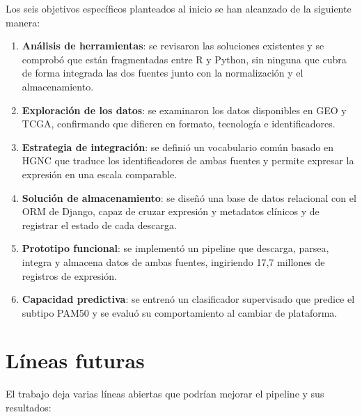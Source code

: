 \documentclass[12pt, a4paper]{report}
\begin{document}
Los seis objetivos específicos planteados al inicio se han alcanzado de la siguiente manera:

\begin{enumerate}
  \item \textbf{Análisis de herramientas}: se revisaron las soluciones existentes y se comprobó que están fragmentadas entre R y Python, sin ninguna que cubra de forma integrada las dos fuentes junto con la normalización y el almacenamiento.
  \item \textbf{Exploración de los datos}: se examinaron los datos disponibles en GEO y TCGA, confirmando que difieren en formato, tecnología e identificadores.
  \item \textbf{Estrategia de integración}: se definió un vocabulario común basado en HGNC que traduce los identificadores de ambas fuentes y permite expresar la expresión en una escala comparable.
  \item \textbf{Solución de almacenamiento}: se diseñó una base de datos relacional con el ORM de Django, capaz de cruzar expresión y metadatos clínicos y de registrar el estado de cada descarga.
  \item \textbf{Prototipo funcional}: se implementó un pipeline que descarga, parsea, integra y almacena datos de ambas fuentes, ingiriendo 17,7 millones de registros de expresión.
  \item \textbf{Capacidad predictiva}: se entrenó un clasificador supervisado que predice el subtipo PAM50 y se evaluó su comportamiento al cambiar de plataforma.
\end{enumerate}

\section{Líneas futuras}

El trabajo deja varias líneas abiertas que podrían mejorar el pipeline y sus resultados:
\end{document}

